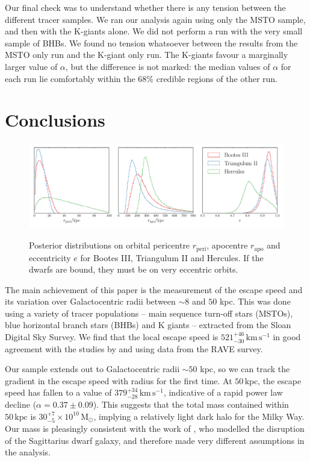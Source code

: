 \documentclass[useAMS,twocolumn,usenatbib]{mn2e}
\def\kpc{{\,\mathrm{kpc}}}
\def\kms{{\,\mathrm{km\,s^{-1}}}}
\def\Msun{{\,\mathrm{M}_\odot}}
\begin{document}
Our final check was to understand whether there is any tension between the different tracer samples. 
We ran our analysis again using only the MSTO sample, and then with the K-giants alone. 
We did not perform a run with the very small sample of BHBs. 
We found no tension whatsoever between the results from the MSTO only run and the K-giant only run. 
The K-giants favour a marginally larger value of $\alpha$, but the difference is not marked: the median values of $\alpha$ for each run lie comfortably within the 68\% credible regions of the other run.

\section{Conclusions}

\begin{figure}
\includegraphics[width=2\columnwidth]{plots/boo_tri_herc}\\
\caption{Posterior distributions on orbital pericentre $r_\mathrm{peri}$, apocentre $r_\mathrm{apo}$ and eccentricity $e$ for Bootes III, Triangulum II and Hercules. 
If the dwarfs are bound, they must be on very eccentric orbits.}
\label{fig:bootriherc}
\end{figure}

The main achievement of this paper is the measurement of the escape speed and its variation over Galactocentric radii between $\sim 8$ and $50$ kpc.  
This was done using a variety of tracer populations -- main sequence turn-off stars (MSTOs), blue horizontal branch stars (BHBs) and K giants -- extracted from the Sloan Digital Sky Survey. 
We find that the local escape speed is $521^{+46}_{-30}\kms$ in good agreement with the studies by \cite{Sm07} and \cite{Pi14} using data from the RAVE survey.

Our sample extends out to Galactocentric radii $\sim 50$ kpc, so we can track the gradient in the escape speed with radius for the first time. 
At $50\kpc$, the escape speed has fallen to a value of $379^{+34}_{-28}\kms$, indicative of a rapid power law decline ($\alpha = 0.37\pm0.09$).
This suggests that the total mass contained within $50\kpc$ is $30^{+7}_{-5}\times10^{10}\Msun$, implying a relatively light dark halo for the Milky Way. 
Our mass is pleasingly consistent with the work of \citet{Gi14}, who modelled the disruption of the Sagittarius dwarf galaxy, and therefore made very different assumptions in the analysis.
\end{document}
